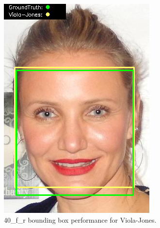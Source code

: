 \documentclass{l4proj}
\begin{document}
\begin{appendices}
\begin{figure}[h!]
  \centering
  \begin{minipage}{0.49\textwidth}
    \centering
     \includegraphics[width=\textwidth]{images/appendix/viola/40.png}
    \caption{40\_f\_r bounding box performance for Viola-Jones.}
    \label{whoopi_result}
  \end{minipage}
    \hfill
    \begin{minipage}{0.49\textwidth}
    \centering

\end{minipage}
\end{figure}
\end{appendices}
\end{document}
